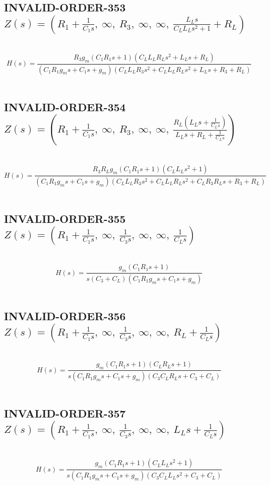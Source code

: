 \documentclass{article}
\begin{document}
\subsection{INVALID-ORDER-353 $Z(s) = \left( R_{1} + \frac{1}{C_{1} s}, \  \infty, \  R_{3}, \  \infty, \  \infty, \  \frac{L_{L} s}{C_{L} L_{L} s^{2} + 1} + R_{L}\right)$ } \ 
\textbf{\[H(s) = \frac{R_{3} g_{m} \left(C_{1} R_{1} s + 1\right) \left(C_{L} L_{L} R_{L} s^{2} + L_{L} s + R_{L}\right)}{\left(C_{1} R_{1} g_{m} s + C_{1} s + g_{m}\right) \left(C_{L} L_{L} R_{3} s^{2} + C_{L} L_{L} R_{L} s^{2} + L_{L} s + R_{3} + R_{L}\right)}\] } \ 
\subsection{INVALID-ORDER-354 $Z(s) = \left( R_{1} + \frac{1}{C_{1} s}, \  \infty, \  R_{3}, \  \infty, \  \infty, \  \frac{R_{L} \left(L_{L} s + \frac{1}{C_{L} s}\right)}{L_{L} s + R_{L} + \frac{1}{C_{L} s}}\right)$ } \ 
\textbf{\[H(s) = \frac{R_{3} R_{L} g_{m} \left(C_{1} R_{1} s + 1\right) \left(C_{L} L_{L} s^{2} + 1\right)}{\left(C_{1} R_{1} g_{m} s + C_{1} s + g_{m}\right) \left(C_{L} L_{L} R_{3} s^{2} + C_{L} L_{L} R_{L} s^{2} + C_{L} R_{3} R_{L} s + R_{3} + R_{L}\right)}\] } \ 
\subsection{INVALID-ORDER-355 $Z(s) = \left( R_{1} + \frac{1}{C_{1} s}, \  \infty, \  \frac{1}{C_{3} s}, \  \infty, \  \infty, \  \frac{1}{C_{L} s}\right)$ } \ 
\textbf{\[H(s) = \frac{g_{m} \left(C_{1} R_{1} s + 1\right)}{s \left(C_{3} + C_{L}\right) \left(C_{1} R_{1} g_{m} s + C_{1} s + g_{m}\right)}\] } \ 
\subsection{INVALID-ORDER-356 $Z(s) = \left( R_{1} + \frac{1}{C_{1} s}, \  \infty, \  \frac{1}{C_{3} s}, \  \infty, \  \infty, \  R_{L} + \frac{1}{C_{L} s}\right)$ } \ 
\textbf{\[H(s) = \frac{g_{m} \left(C_{1} R_{1} s + 1\right) \left(C_{L} R_{L} s + 1\right)}{s \left(C_{1} R_{1} g_{m} s + C_{1} s + g_{m}\right) \left(C_{3} C_{L} R_{L} s + C_{3} + C_{L}\right)}\] } \ 
\subsection{INVALID-ORDER-357 $Z(s) = \left( R_{1} + \frac{1}{C_{1} s}, \  \infty, \  \frac{1}{C_{3} s}, \  \infty, \  \infty, \  L_{L} s + \frac{1}{C_{L} s}\right)$ } \ 
\textbf{\[H(s) = \frac{g_{m} \left(C_{1} R_{1} s + 1\right) \left(C_{L} L_{L} s^{2} + 1\right)}{s \left(C_{1} R_{1} g_{m} s + C_{1} s + g_{m}\right) \left(C_{3} C_{L} L_{L} s^{2} + C_{3} + C_{L}\right)}\] } \ 
\end{document}
